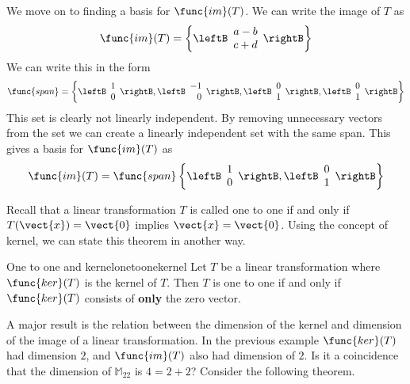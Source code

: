 \begin{solution}
We move on to finding a basis for $\func{im}(T)$. We can write the image of $T$ as 
\[
\func{im}(T) = \left\{ \leftB \begin{array}{c}
a - b \\
c + d
\end{array} \rightB
\right\}
\]
We can write this in the form
\[
\func{span} = \left\{ 
\leftB \begin{array}{r}
1 \\
0
\end{array} \rightB, 
\leftB \begin{array}{r}
-1 \\
0
\end{array} \rightB, 
\leftB \begin{array}{r}
0 \\
1
\end{array} \rightB, 
\leftB \begin{array}{r}
0 \\
1
\end{array} \rightB \right\}
\]
This set is clearly not linearly independent. By removing unnecessary vectors from the set we can create a linearly independent set with the same span. This gives a basis for $\func{im}(T)$ as
\[
\func{im}(T) = \func{span} \left\{
\leftB \begin{array}{r}
1 \\
0
\end{array} \rightB,
\leftB \begin{array}{r}
0 \\
1
\end{array} \rightB
\right\}
\]
\end{solution}

Recall that a linear transformation $T$ is called one to one if and only if $T(\vect{x}) = \vect{0}$ implies $\vect{x} = \vect{0}$. Using the concept of kernel, we can state this theorem in another way.

\begin{theorem}{One to one and kernel}{onetoonekernel}
Let $T$ be a linear transformation where $\func{ker}(T)$ is the kernel of $T$. Then $T$ is one to one if and only if $\func{ker}(T)$ consists of \textbf{only} the zero vector. 
\end{theorem}

A major result is the relation between the dimension of the kernel and
dimension of the image of a linear transformation. In the previous example $\func{ker}(T)$ had dimension $2$, and $\func{im}(T)$ also had dimension of $2$. Is it a coincidence that the dimension of $\mathbb{M}_{22}$ is $4 = 2 + 2$? Consider the following theorem. 

